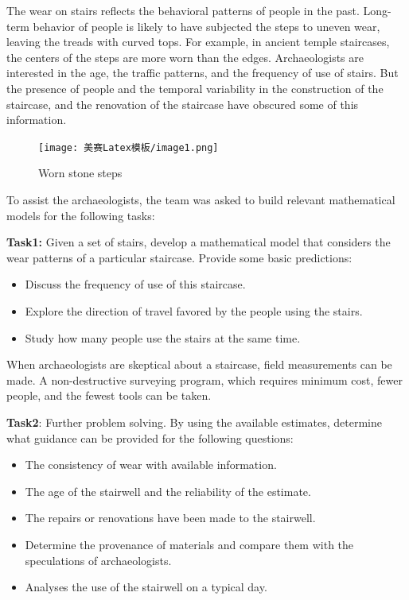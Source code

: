 \documentclass[12pt]{article}  %
\numberwithin{equation}{section} %
\begin{document}
The wear on stairs reflects the behavioral patterns of people in the past. Long-term behavior of people is likely to have subjected the steps to uneven wear, leaving the treads with curved tops. For example, in ancient temple staircases, the centers of the steps are more worn than the edges. Archaeologists are interested in the age, the traffic patterns, and the frequency of use of stairs. But the presence of people and the temporal variability in the construction of the staircase, and the renovation of the staircase have obscured some of this information.
\begin{figure}[H]
	\centering
	\texttt{[image: 美赛Latex模板/image1.png]}
	\caption{Worn stone steps}
	\label{stair1}
     \vspace{-2em} %
\end{figure}

To assist the archaeologists, the team was asked to build relevant mathematical models for the following tasks:

\textbf{Task1:} Given a set of stairs, develop a mathematical model that considers the wear patterns of a particular staircase. Provide some basic predictions:
\begin{itemize}
	\setlength{\parsep}{0ex} %
	\setlength{\topsep}{0ex} %
	\setlength{\itemsep}{0ex} %
	\item Discuss the frequency of use of this staircase.
	\item Explore the direction of travel favored by the people using the stairs.
	\item Study how many people use the stairs at the same time.
\end{itemize}

When archaeologists are skeptical about a staircase, field measurements can be made. A non-destructive surveying program, which requires minimum cost, fewer people, and the fewest tools can be taken.

\textbf{Task2}: Further problem solving. By using the available estimates, determine what guidance can be provided for the following questions:
\begin{itemize}
	\setlength{\parsep}{0ex} %
	\setlength{\topsep}{0ex} %
	\setlength{\itemsep}{0ex} %
	\item The consistency of wear with available information.
	\item The age of the stairwell and the reliability of the estimate.
	\item The repairs or renovations have been made to the stairwell.
    \item Determine the provenance of materials and compare them with the speculations of archaeologists.
    \item Analyses the use of the stairwell on a typical day.
\end{itemize}
\end{document}
